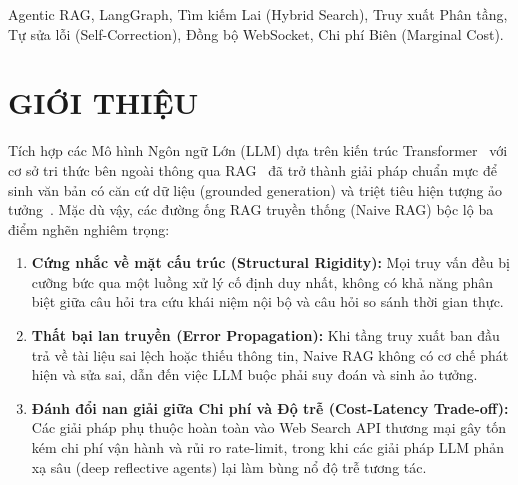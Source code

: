 \documentclass[conference]{IEEEtran}
\begin{document}
\begin{IEEEkeywords}
Agentic RAG, LangGraph, Tìm kiếm Lai (Hybrid Search), Truy xuất Phân tầng, Tự sửa lỗi (Self-Correction), Đồng bộ WebSocket, Chi phí Biên (Marginal Cost).
\end{IEEEkeywords}

\section{GIỚI THIỆU}
Tích hợp các Mô hình Ngôn ngữ Lớn (LLM) dựa trên kiến trúc Transformer~\cite{vaswani2017attention} với cơ sở tri thức bên ngoài thông qua RAG~\cite{lewis2020retrieval} đã trở thành giải pháp chuẩn mực để sinh văn bản có căn cứ dữ liệu (grounded generation) và triệt tiêu hiện tượng ảo tưởng~\cite{ji2023survey}. Mặc dù vậy, các đường ống RAG truyền thống (Naive RAG) bộc lộ ba điểm nghẽn nghiêm trọng:
\begin{enumerate}
    \item \textbf{Cứng nhắc về mặt cấu trúc (Structural Rigidity):} Mọi truy vấn đều bị cưỡng bức qua một luồng xử lý cố định duy nhất, không có khả năng phân biệt giữa câu hỏi tra cứu khái niệm nội bộ và câu hỏi so sánh thời gian thực.
    \item \textbf{Thất bại lan truyền (Error Propagation):} Khi tầng truy xuất ban đầu trả về tài liệu sai lệch hoặc thiếu thông tin, Naive RAG không có cơ chế phát hiện và sửa sai, dẫn đến việc LLM buộc phải suy đoán và sinh ảo tưởng.
    \item \textbf{Đánh đổi nan giải giữa Chi phí và Độ trễ (Cost-Latency Trade-off):} Các giải pháp phụ thuộc hoàn toàn vào Web Search API thương mại gây tốn kém chi phí vận hành và rủi ro rate-limit, trong khi các giải pháp LLM phản xạ sâu (deep reflective agents) lại làm bùng nổ độ trễ tương tác.
\end{enumerate}
\end{document}
